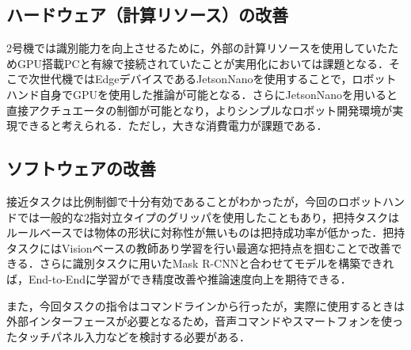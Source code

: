 \subsection*{ハードウェア（計算リソース）の改善}
2号機では識別能力を向上させるために，外部の計算リソースを使用していたためGPU搭載PCと有線で接続されていたことが実用化においては課題となる．そこで次世代機ではEdgeデバイスであるJetsonNanoを使用することで，ロボットハンド自身でGPUを使用した推論が可能となる．さらにJetsonNanoを用いると直接アクチュエータの制御が可能となり，よりシンプルなロボット開発環境が実現できると考えられる．ただし，大きな消費電力が課題である．

\subsection*{ソフトウェアの改善}
接近タスクは比例制御で十分有効であることがわかったが，今回のロボットハンドでは一般的な2指対立タイプのグリッパを使用したこともあり，把持タスクはルールベースでは物体の形状に対称性が無いものは把持成功率が低かった．把持タスクにはVisionベースの教師あり学習を行い最適な把持点を掴むことで改善できる．さらに識別タスクに用いたMask R-CNNと合わせてモデルを構築できれば，End-to-Endに学習ができ精度改善や推論速度向上を期待できる．

また，今回タスクの指令はコマンドラインから行ったが，実際に使用するときは外部インターフェースが必要となるため，音声コマンドやスマートフォンを使ったタッチパネル入力などを検討する必要がある．
